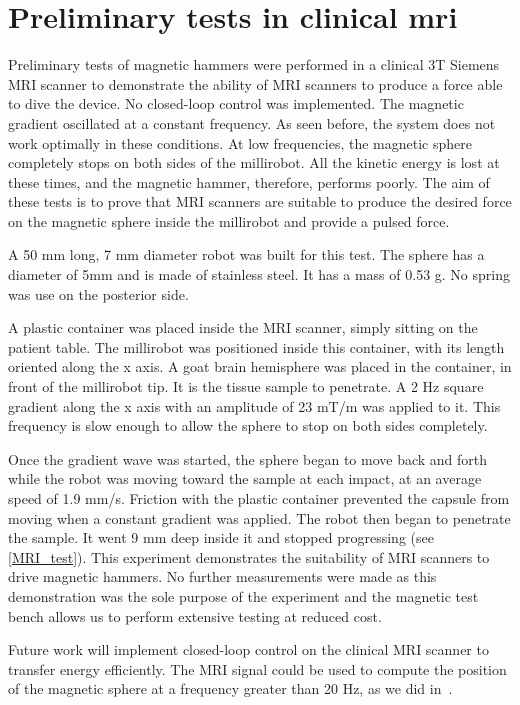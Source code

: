 \documentclass[letterpaper, 10 pt, conference]{ieeeconf}  %
\begin{document}
\section{Preliminary tests in clinical mri}
\label{MRI_tests}
Preliminary tests of magnetic hammers were performed in a clinical 3T Siemens MRI scanner to demonstrate the ability of MRI scanners to produce a force able to dive the device.
No closed-loop control was implemented. 
The magnetic gradient  oscillated at a constant frequency. 
As seen before, the system does not work optimally in these conditions. 
At low frequencies, the magnetic sphere completely stops on both sides of the millirobot. 
All the kinetic energy is lost at these times, and the magnetic hammer, therefore, performs poorly. 
The aim of these tests is to prove that MRI scanners are suitable to produce the desired force on the magnetic sphere inside the millirobot and provide a pulsed force.\par
A 50 mm long, 7 mm diameter robot was built for this test. The sphere has a diameter of 5mm and is made of stainless steel. It has a mass of 0.53 g. No spring was use on the posterior side.\par
A plastic container was placed inside the MRI scanner, simply sitting on the patient table. The millirobot was positioned inside this container, with its length oriented along the x axis. A goat brain hemisphere was placed in the container, in front of the millirobot tip. It is the tissue sample to penetrate.
A 2 Hz square gradient along the x axis with an amplitude of 23 mT/m was applied to it. 
This frequency is slow enough to allow the sphere to stop on both sides completely. \par
Once the gradient wave was started, the sphere began to move back and forth while the robot was moving toward the sample at each impact, at an average speed of 1.9 mm/s. Friction with the plastic container prevented the capsule from moving when a constant gradient was applied. 
 The robot then began to penetrate the sample. It went 9 mm deep inside it and stopped progressing (see \cref{MRI_test}). 
This experiment demonstrates the suitability of MRI scanners to drive magnetic hammers. No further measurements were made as this demonstration was the sole purpose of the experiment and the magnetic test bench allows us to perform extensive testing at reduced cost.\par
Future work will implement closed-loop control on the clinical MRI scanner to transfer energy efficiently. 
The MRI signal could be used to compute the position of the magnetic sphere at a frequency greater than 20 Hz, as we did in~\cite{578}.
\end{document}
